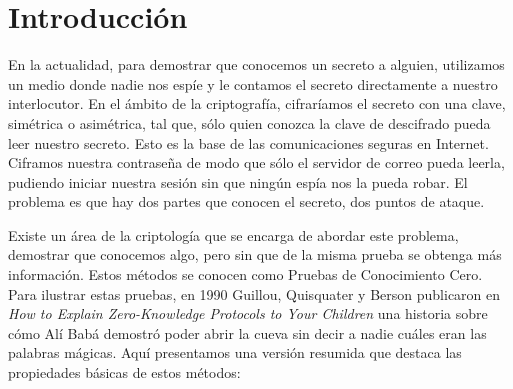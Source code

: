 \chapter{Introducción}\label{ch:introduction}

En la actualidad, para demostrar que conocemos un secreto a alguien, utilizamos un medio donde nadie nos espíe y le contamos el secreto directamente a nuestro interlocutor. En el ámbito de la criptografía, cifraríamos el secreto con una clave, simétrica o asimétrica, tal que, sólo quien conozca la clave de descifrado pueda leer nuestro secreto. Esto es la base de las comunicaciones seguras en Internet. Ciframos nuestra contraseña de modo que sólo el servidor de correo pueda leerla, pudiendo iniciar nuestra sesión sin que ningún espía nos la pueda robar. El problema es que hay dos partes que conocen el secreto, dos puntos de ataque.

Existe un área de la criptología que se encarga de abordar este problema, demostrar que conocemos algo, pero sin que de la misma prueba se obtenga más información. Estos métodos se conocen como Pruebas de Conocimiento Cero. Para ilustrar estas pruebas, en 1990 Guillou, Quisquater y Berson publicaron en \textit{How to Explain Zero-Knowledge Protocols to Your Children} \citep{ZKPcave:story} una historia sobre cómo Alí Babá demostró poder abrir la cueva sin decir a nadie cuáles eran las palabras mágicas. Aquí presentamos una versión resumida que destaca las propiedades básicas de estos métodos:

\hfil

